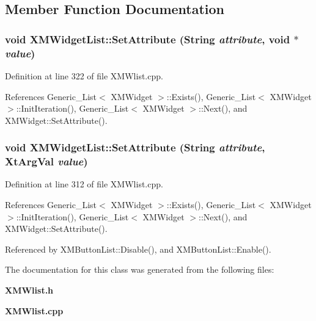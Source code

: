 \subsection{Member Function Documentation}
\subsubsection{\setlength{\rightskip}{0pt plus 5cm}void XMWidget\-List::Set\-Attribute (String {\em attribute}, void $\ast$ {\em value})}\label{classXMWidgetList_a2}




Definition at line 322 of file XMWlist.cpp.

References Generic\_\-List$<$ XMWidget $>$::Exists(), Generic\_\-List$<$ XMWidget $>$::Init\-Iteration(), Generic\_\-List$<$ XMWidget $>$::Next(), and XMWidget::Set\-Attribute().
\subsubsection{\setlength{\rightskip}{0pt plus 5cm}void XMWidget\-List::Set\-Attribute (String {\em attribute}, Xt\-Arg\-Val {\em value})}\label{classXMWidgetList_a1}




Definition at line 312 of file XMWlist.cpp.

References Generic\_\-List$<$ XMWidget $>$::Exists(), Generic\_\-List$<$ XMWidget $>$::Init\-Iteration(), Generic\_\-List$<$ XMWidget $>$::Next(), and XMWidget::Set\-Attribute().

Referenced by XMButton\-List::Disable(), and XMButton\-List::Enable().

The documentation for this class was generated from the following files:\begin{CompactItemize}
\item 
{\bf XMWlist.h}\item 
{\bf XMWlist.cpp}\end{CompactItemize}
